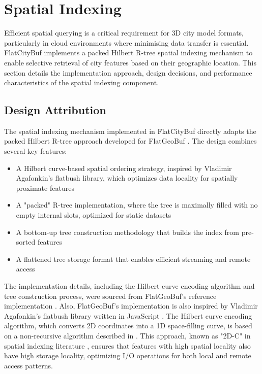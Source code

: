 
\section{Spatial Indexing}
\label{methodology:spatial_index}

Efficient spatial querying is a critical requirement for 3D city model formats, particularly in cloud environments where minimising data transfer is essential. FlatCityBuf implements a packed Hilbert R-tree spatial indexing mechanism \citep{Roussopoulos_Leifker_1985} to enable selective retrieval of city features based on their geographic location. This section details the implementation approach, design decisions, and performance characteristics of the spatial indexing component.

\subsection{Design Attribution}
\label{methodology:spatial_index:attribution}

The spatial indexing mechanism implemented in FlatCityBuf directly adapts the packed Hilbert R-tree approach developed for FlatGeoBuf \citep{horance_2022_detail}. The design combines several key features:

\begin{itemize}
  \item A Hilbert curve-based spatial ordering strategy, inspired by Vladimir Agafonkin's flatbush library, which optimizes data locality for spatially proximate features
  \item A "packed" R-tree implementation, where the tree is maximally filled with no empty internal slots, optimized for static datasets
  \item A bottom-up tree construction methodology that builds the index from pre-sorted features
  \item A flattened tree storage format that enables efficient streaming and remote access
\end{itemize}

The implementation details, including the Hilbert curve encoding algorithm and tree construction process, were sourced from FlatGeoBuf's reference implementation \citep{flatgeobuf_github}. Also, FlatGeoBuf's implementation is also inspired by Vladimir Agafonkin's flatbush library written in JavaScript \citep{vladimir_2018}. The Hilbert curve encoding algorithm, which converts 2D coordinates into a 1D space-filling curve, is based on a non-recursive algorithm described in \citet{hacker_delight_2012}. This approach, known as "2D-C" in spatial indexing literature \citep{hacker_delight_2012}, ensures that features with high spatial locality also have high storage locality, optimizing I/O operations for both local and remote access patterns.

